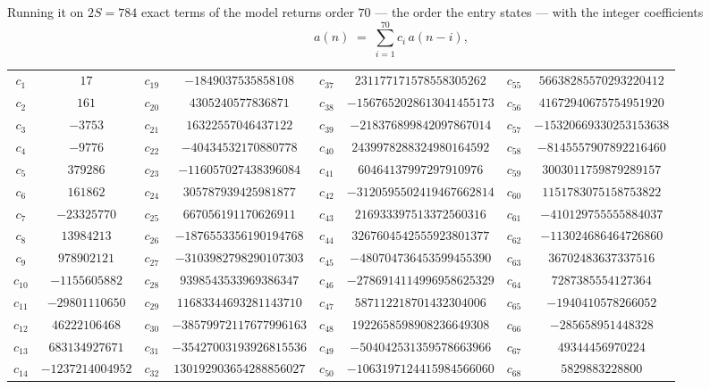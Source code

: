 \documentclass[11pt,a4paper]{article}
\theoremstyle{plain}
\theoremstyle{definition}
\begin{document}
Running it on $2S=784$ exact terms of the model returns order $70$ --- the order the
entry states --- with the integer coefficients
\[
a(n)\;=\;\sum_{i=1}^{70}c_i\,a(n-i),
\]
\begin{center}\small
\begin{tabular}{cccccccc}
$c_{1}$ & $17$ & $c_{19}$ & $-1849037535858108$ & $c_{37}$ & $231177171578558305262$ & $c_{55}$ & $56638285570293220412$ \\
$c_{2}$ & $161$ & $c_{20}$ & $4305240577836871$ & $c_{38}$ & $-1567652028613041455173$ & $c_{56}$ & $41672940675754951920$ \\
$c_{3}$ & $-3753$ & $c_{21}$ & $16322557046437122$ & $c_{39}$ & $-218376899842097867014$ & $c_{57}$ & $-15320669330253153638$ \\
$c_{4}$ & $-9776$ & $c_{22}$ & $-40434532170880778$ & $c_{40}$ & $2439978288324980164592$ & $c_{58}$ & $-8145557907892216460$ \\
$c_{5}$ & $379286$ & $c_{23}$ & $-116057027438396084$ & $c_{41}$ & $60464137997297910976$ & $c_{59}$ & $3003011759879289157$ \\
$c_{6}$ & $161862$ & $c_{24}$ & $305787939425981877$ & $c_{42}$ & $-3120595502419467662814$ & $c_{60}$ & $1151783075158753822$ \\
$c_{7}$ & $-23325770$ & $c_{25}$ & $667056191170626911$ & $c_{43}$ & $216933397513372560316$ & $c_{61}$ & $-410129755555884037$ \\
$c_{8}$ & $13984213$ & $c_{26}$ & $-1876553356190194768$ & $c_{44}$ & $3267604542555923801377$ & $c_{62}$ & $-113024686464726860$ \\
$c_{9}$ & $978902121$ & $c_{27}$ & $-3103982798290107303$ & $c_{45}$ & $-480704736453599455390$ & $c_{63}$ & $36702483637337516$ \\
$c_{10}$ & $-1155605882$ & $c_{28}$ & $9398543533969386347$ & $c_{46}$ & $-2786914114996958625329$ & $c_{64}$ & $7287385554127364$ \\
$c_{11}$ & $-29801110650$ & $c_{29}$ & $11683344693281143710$ & $c_{47}$ & $587112218701432304006$ & $c_{65}$ & $-1940410578266052$ \\
$c_{12}$ & $46222106468$ & $c_{30}$ & $-38579972117677996163$ & $c_{48}$ & $1922658598908236649308$ & $c_{66}$ & $-285658951448328$ \\
$c_{13}$ & $683134927671$ & $c_{31}$ & $-35427003193926815536$ & $c_{49}$ & $-504042531359578663966$ & $c_{67}$ & $49344456970224$ \\
$c_{14}$ & $-1237214004952$ & $c_{32}$ & $130192903654288856027$ & $c_{50}$ & $-1063197124415984566060$ & $c_{68}$ & $5829883228800$ \\

\end{tabular}
\end{center}
\end{document}
